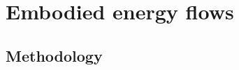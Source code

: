 %
%
%

\chapter{Embodied energy flows}
\label{chap:embodied_energy} 





\section{Methodology}
\label{sec:embodied_methodology}

